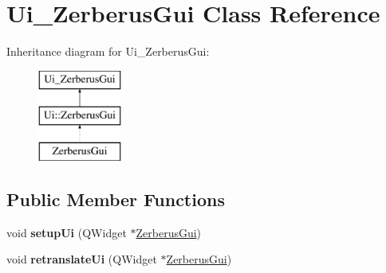 \hypertarget{class_ui___zerberus_gui}{}\section{Ui\+\_\+\+Zerberus\+Gui Class Reference}
\label{class_ui___zerberus_gui}
Inheritance diagram for Ui\+\_\+\+Zerberus\+Gui\+:\begin{figure}[H]
\begin{center}
\leavevmode
\includegraphics[height=3.000000cm]{class_ui___zerberus_gui}
\end{center}
\end{figure}
\subsection*{Public Member Functions}
\begin{DoxyCompactItemize}
\item 
\mbox{\label{class_ui___zerberus_gui_a7f1e34c86a6930aa599a2b203d7329ba}} 
void {\bfseries setup\+Ui} (Q\+Widget $\ast$\hyperlink{class_zerberus_gui}{Zerberus\+Gui})
\item 
\mbox{\label{class_ui___zerberus_gui_ae22fe2c58b1cfc72a8291b3e1d8e3af6}} 
void {\bfseries retranslate\+Ui} (Q\+Widget $\ast$\hyperlink{class_zerberus_gui}{Zerberus\+Gui})
\end{DoxyCompactItemize}

